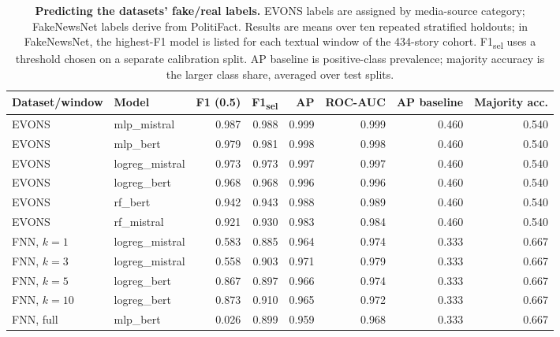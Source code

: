 \begin{table}[!ht]
\centering
\caption{{\bf Predicting the datasets' fake/real labels.} EVONS labels are assigned by media-source category; FakeNewsNet labels derive from PolitiFact. Results are means over ten repeated stratified holdouts; in FakeNewsNet, the highest-F1 model is listed for each textual window of the 434-story cohort. F1\textsubscript{sel} uses a threshold chosen on a separate calibration split. AP baseline is positive-class prevalence; majority accuracy is the larger class share, averaged over test splits.}
\label{tab:veracity-results}
\footnotesize
\begin{tabular}{llrrrrrr}
\toprule
Dataset/window & Model & F1 (0.5) & F1\textsubscript{sel} & AP & ROC-AUC & AP baseline & Majority acc. \\
\midrule
EVONS & mlp\_mistral & 0.987 & 0.988 & 0.999 & 0.999 & 0.460 & 0.540 \\
EVONS & mlp\_bert & 0.979 & 0.981 & 0.998 & 0.998 & 0.460 & 0.540 \\
EVONS & logreg\_mistral & 0.973 & 0.973 & 0.997 & 0.997 & 0.460 & 0.540 \\
EVONS & logreg\_bert & 0.968 & 0.968 & 0.996 & 0.996 & 0.460 & 0.540 \\
EVONS & rf\_bert & 0.942 & 0.943 & 0.988 & 0.989 & 0.460 & 0.540 \\
EVONS & rf\_mistral & 0.921 & 0.930 & 0.983 & 0.984 & 0.460 & 0.540 \\
\midrule
FNN, $k=1$ & logreg\_mistral & 0.583 & 0.885 & 0.964 & 0.974 & 0.333 & 0.667 \\
FNN, $k=3$ & logreg\_mistral & 0.558 & 0.903 & 0.971 & 0.979 & 0.333 & 0.667 \\
FNN, $k=5$ & logreg\_bert & 0.867 & 0.897 & 0.966 & 0.974 & 0.333 & 0.667 \\
FNN, $k=10$ & logreg\_bert & 0.873 & 0.910 & 0.965 & 0.972 & 0.333 & 0.667 \\
FNN, full & mlp\_bert & 0.026 & 0.899 & 0.959 & 0.968 & 0.333 & 0.667 \\
\bottomrule
\end{tabular}
\end{table}
